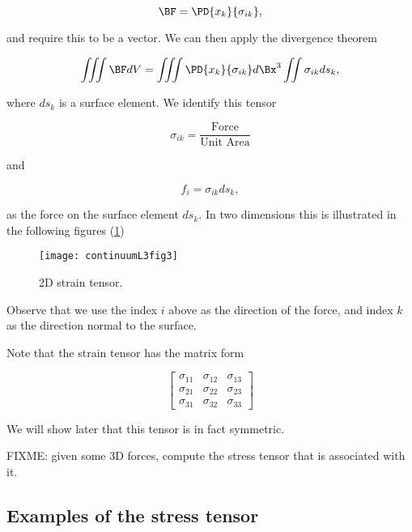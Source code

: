\begin{equation}\label{eqn:continuumL3:270}
\BF = \PD{x_k}{\sigma_{ik}},
\end{equation}

and require this to be a vector.  We can then apply the divergence theorem

\begin{equation}\label{eqn:continuumL3:290}
\iiint \BF dV 
= \iiint \PD{x_k}{\sigma_{ik}} d\Bx^3 
\iint \sigma_{ik} ds_k,
\end{equation}

where $ds_k$ is a surface element.  We identify this tensor

\begin{equation}\label{eqn:continuumL3:310}
\sigma_{ik} = \frac{\text{Force}}{\text{Unit Area}}
\end{equation}

and 

\begin{equation}\label{eqn:continuumL3:330}
f_i = \sigma_{ik} ds_k,
\end{equation}

as the force on the surface element $ds_k$.  In two dimensions this is illustrated in the following figures (\ref{fig:continuumL3:continuumL3fig3})
\begin{figure}[htp]
   \centering
   \texttt{[image: continuumL3fig3]}
   \caption{2D strain tensor.}\label{fig:continuumL3:continuumL3fig3}
\end{figure}

Observe that we use the index $i$ above as the direction of the force, and index $k$ as the direction normal to the surface.

Note that the strain tensor has the matrix form

\begin{equation}\label{eqn:continuumL3:350}
\begin{bmatrix}
\sigma_{11} & \sigma_{12} & \sigma_{13} \\
\sigma_{21} & \sigma_{22} & \sigma_{23} \\
\sigma_{31} & \sigma_{32} & \sigma_{33}
\end{bmatrix}
\end{equation}

We will show later that this tensor is in fact symmetric.

FIXME: given some 3D forces, compute the stress tensor that is associated with it.

\subsection{Examples of the stress tensor}

